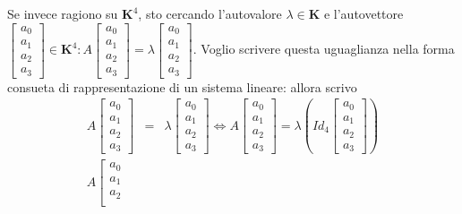 \documentclass{article}
\begin{document}
\begin{enumerate}
Se invece ragiono su $\mathbf{K}^{4}$, sto cercando l'autovalore $\lambda
\in \mathbf{K}$ e l'autovettore $\left[ 
\begin{array}{c}
a_{0} \\ 
a_{1} \\ 
a_{2} \\ 
a_{3}%
\end{array}%
\right] \in \mathbf{K}^{4}:A\left[ 
\begin{array}{c}
a_{0} \\ 
a_{1} \\ 
a_{2} \\ 
a_{3}%
\end{array}%
\right] =\lambda \left[ 
\begin{array}{c}
a_{0} \\ 
a_{1} \\ 
a_{2} \\ 
a_{3}%
\end{array}%
\right] $. Voglio scrivere questa uguaglianza nella forma consueta di
rappresentazione di un sistema lineare: allora scrivo%
\begin{eqnarray*}
A\left[ 
\begin{array}{c}
a_{0} \\ 
a_{1} \\ 
a_{2} \\ 
a_{3}%
\end{array}%
\right] &=&\lambda \left[ 
\begin{array}{c}
a_{0} \\ 
a_{1} \\ 
a_{2} \\ 
a_{3}%
\end{array}%
\right] \Longleftrightarrow A\left[ 
\begin{array}{c}
a_{0} \\ 
a_{1} \\ 
a_{2} \\ 
a_{3}%
\end{array}%
\right] =\lambda \left( Id_{4}\left[ 
\begin{array}{c}
a_{0} \\ 
a_{1} \\ 
a_{2} \\ 
a_{3}%
\end{array}%
\right] \right) \\
A\left[ 
\begin{array}{c}
a_{0} \\ 
a_{1} \\ 
a_{2} \\ 

\end{array}
\end{eqnarray*}
\end{enumerate}
\end{document}
